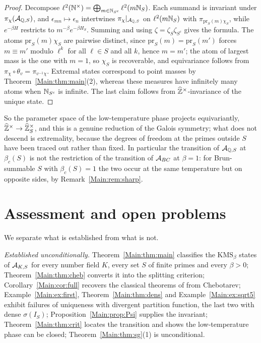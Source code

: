 \begin{proof}
Decompose $\ell^2(\mathbb{N}^\times)=\bigoplus_{m\in\mathbb{N}_{S^c}}\ell^2(m\mathbb{N}_S)$. Each
summand is invariant under $\pi_\chi(\mathcal{A}_{\mathbb{Q},S})$, and $\epsilon_{mn}\mapsto\epsilon_n$
intertwines $\pi_\chi|_{\mathcal{A}_{\mathbb{Q},S}}$ on $\ell^2(m\mathbb{N}_S)$ with
$\pi_{\mathrm{pr}_S(m)\chi_S}$, while $e^{-\beta H}$ restricts to
$m^{-\beta}e^{-\beta H_S}$. Summing and using $\zeta=\zeta_S\zeta_{S^c}$ gives
the formula. The atoms $\mathrm{pr}_S(m)\chi_S$ are pairwise distinct, since
$\mathrm{pr}_S(m)=\mathrm{pr}_S(m')$ forces $m\equiv m'$ modulo $\ell^k$ for all
$\ell\in S$ and all $k$, hence $m=m'$; the atom of largest mass is the one with
$m=1$, so $\chi_S$ is recoverable, and equivariance follows from
$\pi_\chi\circ\theta_v=\pi_{v^{-1}\chi}$. Extremal states correspond to point
masses by Theorem~\ref{Main:thm:main}(2), whereas these measures have infinitely
many atoms when $\mathbb{N}_{S^c}$ is infinite. The last claim follows from
$\widehat{\mathbb{Z}}^\times$-invariance of the unique state.
\end{proof}

\begin{remark}
So the parameter space of the low-temperature phase projects equivariantly,
$\widehat{\mathbb{Z}}^\times\to\widehat{\mathbb{Z}}_S^\times$, and this is a genuine reduction of the Galois
symmetry; what does not descend is extremality, because the degrees of freedom
at the primes outside $S$ have been traced out rather than fixed. In
particular the transition of $\mathcal{A}_{\mathbb{Q},S}$ at $\beta_c(S)$ is not the
restriction of the transition of $\mathcal{A}_{BC}$ at $\beta=1$: for Brun-summable $S$
with $\beta_c(S)=1$ the two occur at the same temperature but on opposite
sides, by Remark~\ref{Main:rem:sharp}.
\end{remark}

\section{Assessment and open problems}\label{Main:sec:assessment}

We separate what is established from what is not.

\emph{Established unconditionally.} Theorem~\ref{Main:thm:main} classifies the
$\mathrm{KMS}_\beta$ states of $\mathcal{A}_{K,S}$ for every number field $K$, every
set $S$ of finite primes and every $\beta>0$; Theorem~\ref{Main:thm:cheb} converts
it into the splitting criterion; Corollary~\ref{Main:cor:full} recovers the
classical theorems of \cite{BC,LLN} from Chebotarev; Example~\ref{Main:ex:first},
Theorem~\ref{Main:thm:dens} and Example~\ref{Main:ex:sqrt5} exhibit failures of
uniqueness with divergent partition function, the last two with dense
$\sigma(I_S)$; Proposition~\ref{Main:prop:Psi} supplies the invariant;
Theorem~\ref{Main:thm:crit} locates the transition and shows the low-temperature
phase can be closed; Theorem~\ref{Main:thm:sg}(1) is unconditional.

